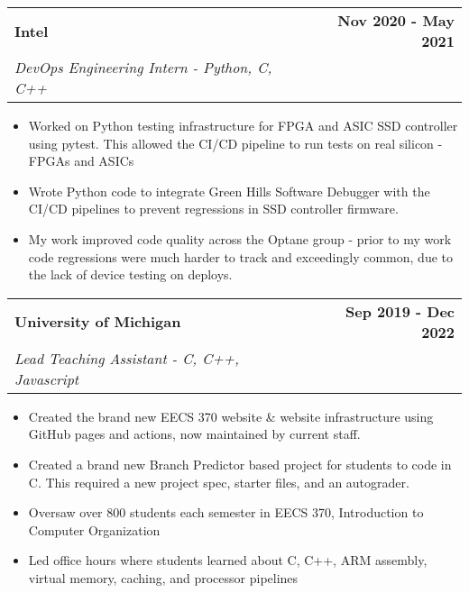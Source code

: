 \documentclass[10pt]{extreport}
\makeatletter
\newcommand{\resumeSubheading}[4]{
  \vspace{-1pt}
    \begin{tabular*}{1.0\textwidth}{l@{\extracolsep{\fill}}r}
      \textbf{#1} & \textbf{#2}  \vspace{1mm} \\
      {#3} & \textbf{#4} \\
    \end{tabular*}\vspace{-3pt}
}
\makeatother
\begin{document}
    \resumeSubheading{Intel}{Nov 2020 - May 2021}
    {\textit{DevOps Engineering Intern - Python, C, C++}}{}
    \vspace{-2mm}
    \begin{itemize}
    \item[\textperiodcentered] Worked on Python testing infrastructure for FPGA and ASIC SSD controller using pytest. This allowed the CI/CD pipeline to run tests on real silicon - FPGAs and ASICs
            \vspace{-2mm}

    \item[\textperiodcentered] Wrote Python code to integrate Green Hills Software Debugger with the CI/CD pipelines to prevent regressions in SSD controller firmware. 
            \vspace{-2mm}

    \item[\textperiodcentered] My work 
 improved code quality across the Optane group - prior to my work code regressions were much harder to track and exceedingly common, due to the lack of device testing on deploys.
    \end{itemize}
    
    \resumeSubheading{University of Michigan}{Sep 2019 - Dec 2022}
    {\textit{Lead Teaching Assistant - C, C++, Javascript}}{}
        \vspace{-2mm}
    \begin{itemize}
    \item[\textperiodcentered] Created the brand new EECS 370 website \& website infrastructure using GitHub pages and actions, now maintained by current staff.
        \vspace{-2mm}
    \item[\textperiodcentered] Created a brand new Branch Predictor based project for students to code in C. This required a new project spec, starter files, and an autograder.
        \vspace{-2mm}
    \item[\textperiodcentered] Oversaw over 800 students each semester in EECS 370, Introduction to Computer Organization
        \vspace{-2mm}
    \item[\textperiodcentered] Led office hours where students learned
    about C, C++, ARM assembly, virtual memory, caching, and processor pipelines
    \end{itemize}
\end{document}
